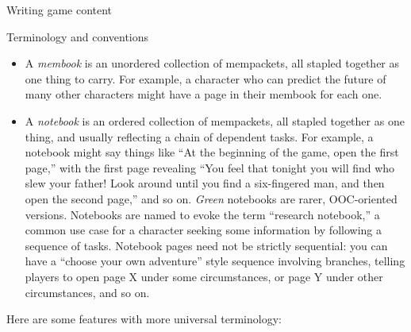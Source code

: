 \documentclass{article}
\begin{document}
\begin{section}{Writing game content}
\begin{subsection}{Terminology and conventions}
\begin{itemize}
    \item A \textit{membook} is an unordered collection of mempackets, all stapled together as one thing to carry.  For example, a character who can predict the future of many other characters might have a page in their membook for each one.
    \item A \textit{notebook} is an ordered collection of mempackets, all stapled together as one thing, and usually reflecting a chain of dependent tasks.  For example, a notebook might say things like ``At the beginning of the game, open the first page,'' with the first page revealing ``You feel that tonight you will find who slew your father!  Look around until you find a six-fingered man, and then open the second page,'' and so on.  \textit{Green} notebooks are rarer, OOC-oriented versions.  Notebooks are named to evoke the term ``research notebook,'' a common use case for a character seeking some information by following a sequence of tasks.
    Notebook pages need not be strictly sequential: you can have a ``choose your own adventure'' style sequence involving branches, telling players to open page X under some circumstances, or page Y under other circumstances, and so on.
\end{itemize}

Here are some \gametex{} features with more universal terminology:


\end{subsection}
\end{section}
\end{document}
